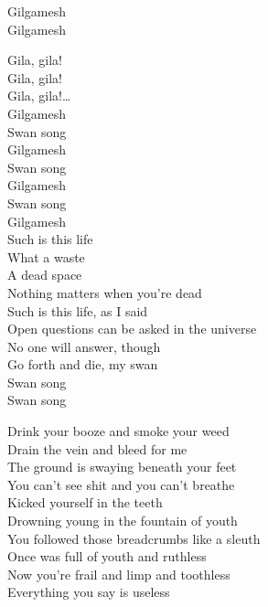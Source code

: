 Gilgamesh \\
Gilgamesh \\


Gila, gila! \\
Gila, gila! \\
Gila, gila!… \\

Gilgamesh \\
Swan song \\
Gilgamesh \\
Swan song \\
Gilgamesh \\
Swan song \\

Gilgamesh \\

Such is this life \\
What a waste \\
A dead space \\
Nothing matters when you're dead \\
Such is this life, as I said \\
Open questions can be asked in the universe \\
No one will answer, though \\
Go forth and die, my swan \\

Swan song \\
Swan song \\



Drink your booze and smoke your weed \\
Drain the vein and bleed for me \\
The ground is swaying beneath your feet \\
You can't see shit and you can't breathe \\
Kicked yourself in the teeth \\
Drowning young in the fountain of youth \\
You followed those breadcrumbs like a sleuth \\
Once was full of youth and ruthless \\
Now you're frail and limp and toothless \\
Everything you say is useless \\


